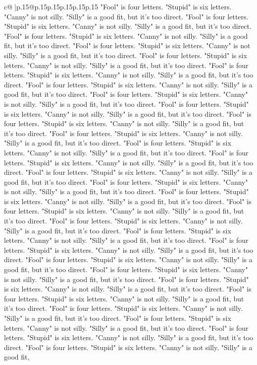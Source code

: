 \documentclass{article}
\begin{document}
{\begin{supertabular}{c@{$\;$}|p{.15\linewidth}@{}p{.15\linewidth}p{.15\linewidth}p{.15\linewidth}p{.15\linewidth}p{.15\linewidth}}
{{{"Fool" is four letters. "Stupid" is six letters. "Canny" is not silly. "Silly" is a good fit, but it's too direct. "Fool" is four letters. "Stupid" is six letters. "Canny" is not silly. "Silly" is a good fit, but it's too direct. "Fool" is four letters. "Stupid" is six letters. "Canny" is not silly. "Silly" is a good fit, but it's too direct. "Fool" is four letters. "Stupid" is six letters. "Canny" is not silly. "Silly" is a good fit, but it's too direct. "Fool" is four letters. "Stupid" is six letters. "Canny" is not silly. "Silly" is a good fit, but it's too direct. "Fool" is four letters. "Stupid" is six letters. "Canny" is not silly. "Silly" is a good fit, but it's too direct. "Fool" is four letters. "Stupid" is six letters. "Canny" is not silly. "Silly" is a good fit, but it's too direct. "Fool" is four letters. "Stupid" is six letters. "Canny" is not silly. "Silly" is a good fit, but it's too direct. "Fool" is four letters. "Stupid" is six letters. "Canny" is not silly. "Silly" is a good fit, but it's too direct. "Fool" is four letters. "Stupid" is six letters. "Canny" is not silly. "Silly" is a good fit, but it's too direct. "Fool" is four letters. "Stupid" is six letters. "Canny" is not silly. "Silly" is a good fit, but it's too direct. "Fool" is four letters. "Stupid" is six letters. "Canny" is not silly. "Silly" is a good fit, but it's too direct. "Fool" is four letters. "Stupid" is six letters. "Canny" is not silly. "Silly" is a good fit, but it's too direct. "Fool" is four letters. "Stupid" is six letters. "Canny" is not silly. "Silly" is a good fit, but it's too direct. "Fool" is four letters. "Stupid" is six letters. "Canny" is not silly. "Silly" is a good fit, but it's too direct. "Fool" is four letters. "Stupid" is six letters. "Canny" is not silly. "Silly" is a good fit, but it's too direct. "Fool" is four letters. "Stupid" is six letters. "Canny" is not silly. "Silly" is a good fit, but it's too direct. "Fool" is four letters. "Stupid" is six letters. "Canny" is not silly. "Silly" is a good fit, but it's too direct. "Fool" is four letters. "Stupid" is six letters. "Canny" is not silly. "Silly" is a good fit, but it's too direct. "Fool" is four letters. "Stupid" is six letters. "Canny" is not silly. "Silly" is a good fit, but it's too direct. "Fool" is four letters. "Stupid" is six letters. "Canny" is not silly. "Silly" is a good fit, but it's too direct. "Fool" is four letters. "Stupid" is six letters. "Canny" is not silly. "Silly" is a good fit, but it's too direct. "Fool" is four letters. "Stupid" is six letters. "Canny" is not silly. "Silly" is a good fit, but it's too direct. "Fool" is four letters. "Stupid" is six letters. "Canny" is not silly. "Silly" is a good fit, but it's too direct. "Fool" is four letters. "Stupid" is six letters. "Canny" is not silly. "Silly" is a good fit, but it's too direct. "Fool" is four letters. "Stupid" is six letters. "Canny" is not silly. "Silly" is a good fit, but it's too direct. "Fool" is four letters. "Stupid" is six letters. "Canny" is not silly. "Silly" is a good fit, but it's too direct. "Fool" is four letters. "Stupid" is six letters. "Canny" is not silly. "Silly" is a good fit, }}}
\end{supertabular}}
\end{document}
